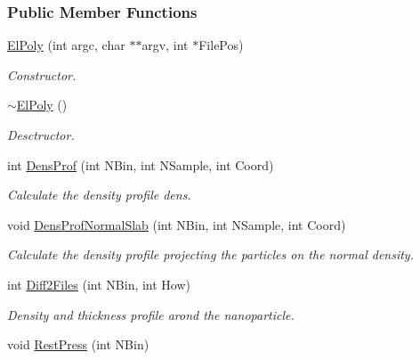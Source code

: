 \subsubsection*{\-Public \-Member \-Functions}
\begin{DoxyCompactItemize}
\item 
\hypertarget{classElPoly_a98503475eca11a72b69cb62879d41183}{\hyperlink{classElPoly_a98503475eca11a72b69cb62879d41183}{\-El\-Poly} (int argc, char $\ast$$\ast$argv, int $\ast$\-File\-Pos)}\label{classElPoly_a98503475eca11a72b69cb62879d41183}

\begin{DoxyCompactList}\small\item\em \-Constructor. \end{DoxyCompactList}\item 
\hypertarget{classElPoly_afdf47e94336886931e93e716f32bb1ee}{\hyperlink{classElPoly_afdf47e94336886931e93e716f32bb1ee}{$\sim$\-El\-Poly} ()}\label{classElPoly_afdf47e94336886931e93e716f32bb1ee}

\begin{DoxyCompactList}\small\item\em \-Desctructor. \end{DoxyCompactList}\item 
int \hyperlink{classElPoly_a70302b7bbfa248d2963323bc63a4a292}{\-Dens\-Prof} (int \-N\-Bin, int \-N\-Sample, int \-Coord)
\begin{DoxyCompactList}\small\item\em \-Calculate the density profile  dens. \end{DoxyCompactList}\item 
void \hyperlink{classElPoly_aff1645802bd67fc1b5bfb3bb1884933a}{\-Dens\-Prof\-Normal\-Slab} (int \-N\-Bin, int \-N\-Sample, int \-Coord)
\begin{DoxyCompactList}\small\item\em \-Calculate the density profile projecting the particles on the normal density. \end{DoxyCompactList}\item 
\hypertarget{classElPoly_a1c3688dd2704504d159802de5815643d}{int \hyperlink{classElPoly_a1c3688dd2704504d159802de5815643d}{\-Diff2\-Files} (int \-N\-Bin, int \-How)}\label{classElPoly_a1c3688dd2704504d159802de5815643d}

\begin{DoxyCompactList}\small\item\em \-Density and thickness profile arond the nanoparticle. \end{DoxyCompactList}\item 
\hypertarget{classElPoly_a019d255b1ff857ccd34550c7409a595b}{void \hyperlink{classElPoly_a019d255b1ff857ccd34550c7409a595b}{\-Rest\-Press} (int \-N\-Bin)}\label{classElPoly_a019d255b1ff857ccd34550c7409a595b}


\end{DoxyCompactItemize}
